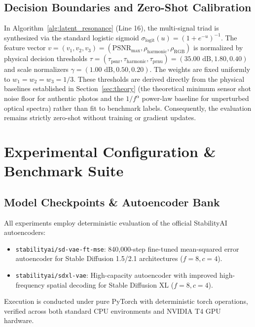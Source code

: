 \documentclass{article}
\theoremstyle{definition}
\begin{document}
\subsection{Decision Boundaries and Zero-Shot Calibration}
\label{sec:calibration}
In Algorithm~\ref{alg:latent_resonance} (Line 16), the multi-signal triad is synthesized via the standard logistic sigmoid $\sigma_{\text{logit}}(u) = (1 + e^{-u})^{-1}$. The feature vector $v = (v_1, v_2, v_3) = (\text{PSNR}_{\max}, \rho_{\text{harmonic}}, \rho_{\text{RGB}})$ is normalized by physical decision thresholds $\tau = (\tau_{\text{psnr}}, \tau_{\text{harmonic}}, \tau_{\text{prnu}}) = (35.00\text{ dB}, 1.80, 0.40)$ and scale normalizers $\gamma = (1.00\text{ dB}, 0.50, 0.20)$. The weights are fixed uniformly to $w_1 = w_2 = w_3 = 1/3$. These thresholds are derived directly from the physical baselines established in Section~\ref{sec:theory} (the theoretical minimum sensor shot noise floor for authentic photos and the $1/f^\alpha$ power-law baseline for unperturbed optical spectra) rather than fit to benchmark labels. Consequently, the evaluation remains strictly zero-shot without training or gradient updates.

\section{Experimental Configuration \& Benchmark Suite}
\label{sec:experiments}

\subsection{Model Checkpoints \& Autoencoder Bank}
All experiments employ deterministic evaluation of the official StabilityAI autoencoders:
\begin{itemize}
    \item \texttt{stabilityai/sd-vae-ft-mse}: 840,000-step fine-tuned mean-squared error autoencoder for Stable Diffusion 1.5/2.1 architectures ($f=8, c=4$).
    \item \texttt{stabilityai/sdxl-vae}: High-capacity autoencoder with improved high-frequency spatial decoding for Stable Diffusion XL ($f=8, c=4$).
\end{itemize}
Execution is conducted under pure PyTorch with deterministic torch operations, verified across both standard CPU environments and NVIDIA T4 GPU hardware.
\end{document}

